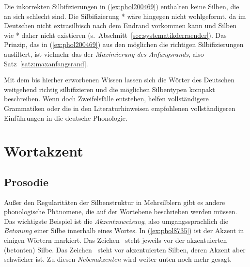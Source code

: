 Die inkorrekten Silbifizierungen in (\ref{ex:phol200469}) enthalten keine Silben, die an sich schlecht sind.
Die Silbifizierung *\textipa{[kOmpl.Et]} wäre hingegen nicht wohlgeformt, da \textipa{[l]} im Deutschen nicht extrasilbisch nach dem Endrand vorkommen kann und Silben wie *\textipa{[kOmpl]} daher nicht existieren (s.\ Abschnitt~\ref{sec:systematikderraender}).
Das Prinzip, das in (\ref{ex:phol200469}) aus den möglichen die richtigen Silbifizierungen ausfiltert, ist vielmehr das der \textit{Maximierung des Anfangsrands}, also Satz~\ref{satz:maxanfangsrand}.


Mit dem bis hierher erworbenen Wissen lassen sich die Wörter des Deutschen weitgehend richtig silbifizieren und die möglichen Silbentypen kompakt beschreiben.
Wenn doch Zweifelsfälle entstehen, helfen vollständigere Grammatiken oder die in den Literaturhinweisen empfohlenen vollständigeren Einführungen in die deutsche Phonologie.

\section{Wortakzent}

\label{sec:wortakzent}

\subsection{Prosodie}

\label{sec:prosodie}


Außer den Regularitäten der Silbenstruktur in Mehrsilblern gibt es andere phonologische Phänomene, die auf der Wortebene beschrieben werden müssen.
Das wichtigste Beispiel ist die \textit{Akzentzuweisung}, also umgangssprachlich die \textit{Betonung} einer Silbe innerhalb eines Wortes.
In (\ref{ex:phol8735}) ist der Akzent in einigen Wörtern markiert.
Das Zeichen \Akz\ steht jeweils vor der akzentuierten (betonten) Silbe.
Das Zeichen \Nakz\ steht vor akzentuierten Silben, deren Akzent aber schwächer ist.
Zu diesen \textit{Nebenakzenten} wird weiter unten noch mehr gesagt.

